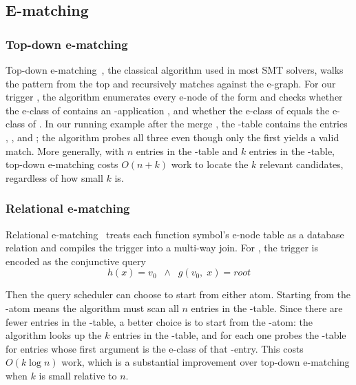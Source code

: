 \subsection{E-matching}

\subsubsection{Top-down e-matching}
\label{sec:bg:topdown}

Top-down e-matching~\cite{simplify}, the classical algorithm used in most SMT
solvers, walks the pattern from the top and recursively matches against the
e-graph. For our trigger , the algorithm enumerates every e-node
of the form  and checks whether
the e-class of  contains an -application , and whether
the e-class of  equals the e-class of . In our running example
after the merge , the -table contains the entries , , and ; the algorithm probes all three
even though only the first yields a valid match. More generally, with $n$
entries in the -table and $k$ entries in the -table, top-down
e-matching costs $O(n + k)$ work to locate the $k$ relevant candidates, regardless
of how small $k$ is.

\subsubsection{Relational e-matching}
\label{sec:bg:relational}

Relational e-matching~\cite{relationalematching} treats each function symbol's
e-node table as a database relation and compiles the trigger into a multi-way
join. For , the trigger is encoded as the conjunctive query
%
\[
  h(x) = v_0 \;\;\wedge\;\; g(v_0,\; x) = root
\]
%

Then the query scheduler can choose to start from either atom. Starting from the
-atom means the algorithm must scan all $n$ entries in the -table.
Since there are fewer entries in the -table, a better choice is to start
from the -atom: the algorithm looks up the $k$ entries in the
-table, and for each one probes the -table for entries whose first
argument is the e-class of that -entry. This costs $O(k \log n)$ work,
which is a substantial improvement over top-down e-matching when $k$ is small
relative to $n$.